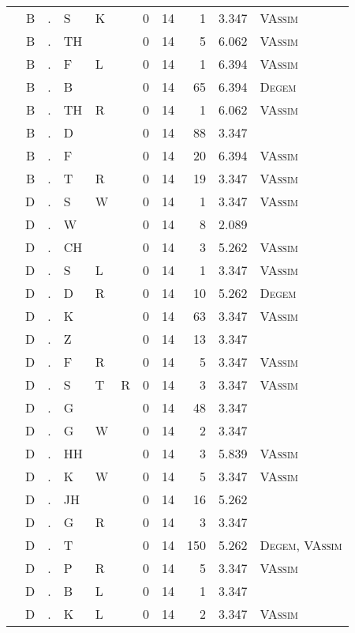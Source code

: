 \begin{longtable}{r@{ } r@{ } c@{ } l@{ } l@{ } l@{ } r r r r l }
 & B & . & S & K &  & 0 & 14 & 1 & 3.347 & \textsc{VAssim} \\
 & B & . & TH &  &  & 0 & 14 & 5 & 6.062 & \textsc{VAssim} \\
 & B & . & F & L &  & 0 & 14 & 1 & 6.394 & \textsc{VAssim} \\
 & B & . & B &  &  & 0 & 14 & 65 & 6.394 & \textsc{Degem} \\
 & B & . & TH & R &  & 0 & 14 & 1 & 6.062 & \textsc{VAssim} \\
 & B & . & D &  &  & 0 & 14 & 88 & 3.347 &  \\
 & B & . & F &  &  & 0 & 14 & 20 & 6.394 & \textsc{VAssim} \\
 & B & . & T & R &  & 0 & 14 & 19 & 3.347 & \textsc{VAssim} \\
 & D & . & S & W &  & 0 & 14 & 1 & 3.347 & \textsc{VAssim} \\
 & D & . & W &  &  & 0 & 14 & 8 & 2.089 &  \\
 & D & . & CH &  &  & 0 & 14 & 3 & 5.262 & \textsc{VAssim} \\
 & D & . & S & L &  & 0 & 14 & 1 & 3.347 & \textsc{VAssim} \\
 & D & . & D & R &  & 0 & 14 & 10 & 5.262 & \textsc{Degem} \\
 & D & . & K &  &  & 0 & 14 & 63 & 3.347 & \textsc{VAssim} \\
 & D & . & Z &  &  & 0 & 14 & 13 & 3.347 &  \\
 & D & . & F & R &  & 0 & 14 & 5 & 3.347 & \textsc{VAssim} \\
 & D & . & S & T & R & 0 & 14 & 3 & 3.347 & \textsc{VAssim} \\
 & D & . & G &  &  & 0 & 14 & 48 & 3.347 &  \\
 & D & . & G & W &  & 0 & 14 & 2 & 3.347 &  \\
 & D & . & HH &  &  & 0 & 14 & 3 & 5.839 & \textsc{VAssim} \\
 & D & . & K & W &  & 0 & 14 & 5 & 3.347 & \textsc{VAssim} \\
 & D & . & JH &  &  & 0 & 14 & 16 & 5.262 &  \\
 & D & . & G & R &  & 0 & 14 & 3 & 3.347 &  \\
 & D & . & T &  &  & 0 & 14 & 150 & 5.262 & \textsc{Degem}, \textsc{VAssim} \\
 & D & . & P & R &  & 0 & 14 & 5 & 3.347 & \textsc{VAssim} \\
 & D & . & B & L &  & 0 & 14 & 1 & 3.347 &  \\
 & D & . & K & L &  & 0 & 14 & 2 & 3.347 & \textsc{VAssim} \\

\end{longtable}
